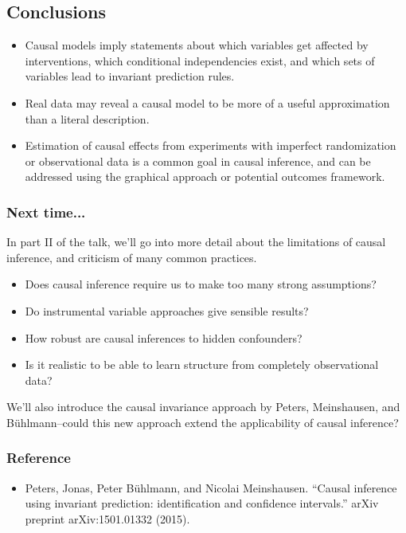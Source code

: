 \documentclass{beamer}
\begin{document}
\begin{frame}
\section{Conclusions}
\sectionpage
\begin{itemize}
\item Causal models imply statements about which variables get affected by interventions,
which conditional independencies exist, and which sets of variables lead to invariant prediction rules.
\item Real data may reveal a causal model to be more of a useful approximation than a literal description.
\item Estimation of causal effects from experiments with imperfect randomization or observational data is a common goal in causal inference, and can be addressed using the graphical approach or potential outcomes framework.
\end{itemize}
\end{frame}


\begin{frame}
\frametitle{Next time...}
In part II of the talk, we'll go into more detail about the limitations of causal inference, and criticism of many common practices.
\begin{itemize}
\item Does causal inference require us to make too many strong assumptions?
\item Do instrumental variable approaches give sensible results?
\item How robust are causal inferences to hidden confounders?
\item Is it realistic to be able to learn structure from completely observational data?
\end{itemize}

We'll also introduce the causal invariance approach by Peters, Meinshausen, and B\"{u}hlmann--could this new approach extend the applicability of causal inference?

\end{frame}

\begin{frame}
\frametitle{Reference}
\begin{itemize}
\item Peters, Jonas, Peter B\"{u}hlmann, and Nicolai Meinshausen. ``Causal inference using invariant prediction: identification and confidence intervals.'' arXiv preprint arXiv:1501.01332 (2015).
\end{itemize}
\end{frame}
\end{document}
